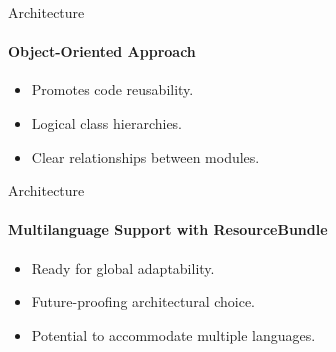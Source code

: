 \documentclass[
    ngerman,%
    authorontitle=true,
]{bfhbeamer}
\begin{document}
    \begin{frame}{Architecture}
        \framesubtitle{Object-Oriented Approach}
        \begin{itemize}
            \item Promotes code reusability.
            \item Logical class hierarchies.
            \item Clear relationships between modules.
        \end{itemize}
    \end{frame}

    \begin{frame}{Architecture}
        \framesubtitle{Multilanguage Support with ResourceBundle}
        \begin{itemize}
            \item Ready for global adaptability.
            \item Future-proofing architectural choice.
            \item Potential to accommodate multiple languages.
        \end{itemize}
    \end{frame}
\end{document}
